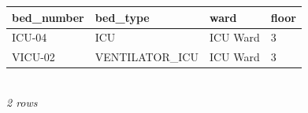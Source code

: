 {\scriptsize\setlength{\tabcolsep}{2.5pt}\begin{tabular}{llll}\toprule
\textbf{bed\_number} & \textbf{bed\_type} & \textbf{ward} & \textbf{floor} \\\midrule
ICU-04 & ICU & ICU Ward & 3 \\
VICU-02 & VENTILATOR\_ICU & ICU Ward & 3 \\
\bottomrule\end{tabular}}\\[-1pt]{\tiny\itshape 2 rows}
